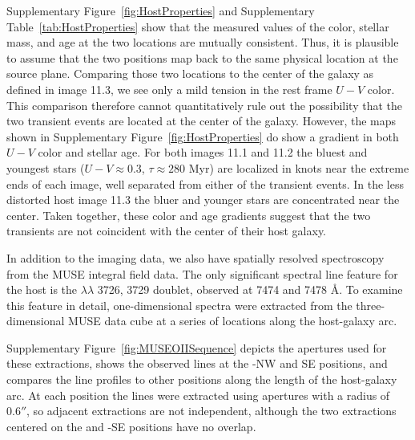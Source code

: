 Supplementary Figure~\ref{fig:HostProperties} and Supplementary
Table~\ref{tab:HostProperties} show that the measured values of the
color, stellar mass, and age at the two \spock locations are mutually
consistent. Thus, it is plausible to assume that the two positions map
back to the same physical location at the source plane.  Comparing
those two locations to the center of the galaxy as defined in image
11.3, we see only a mild tension in the rest frame $U-V$ color. This
comparison therefore cannot quantitatively rule out the possibility
that the two transient events are located at the center of the
galaxy. However, the maps shown in Supplementary Figure~\ref{fig:HostProperties} do
show a gradient in both $U-V$ color and stellar age. For both images
11.1 and 11.2 the bluest and youngest stars ($U-V\approx0.3$,
$\tau\approx280$ Myr) are localized in knots near the extreme ends of
each image, well separated from either of the \spock transient events.
In the less distorted host image 11.3 the bluer and younger stars are
concentrated near the center. Taken together, these color and age
gradients suggest that the two transients are not coincident with the
center of their host galaxy.



In addition to the \HST imaging data, we also have spatially resolved
spectroscopy from the MUSE integral field data.  The only significant
spectral line feature for the \spock host is the 
$\lambda\lambda$ 3726, 3729 doublet, observed at 7474 and 7478 \AA.
To examine this feature in detail, one-dimensional spectra were
extracted from the three-dimensional MUSE data cube at a series of
locations along the \spock host-galaxy arc.

Supplementary Figure~\ref{fig:MUSEOIISequence} depicts the apertures used for these
extractions, shows the observed  lines at the
\spock-NW and SE positions, and compares the  line
profiles to other positions along the length of the host-galaxy arc.
At each position the lines were extracted using apertures with a
radius of $0.6''$, so adjacent extractions are not independent,
although the two extractions centered on the \spockone and -SE
positions have no overlap.  

